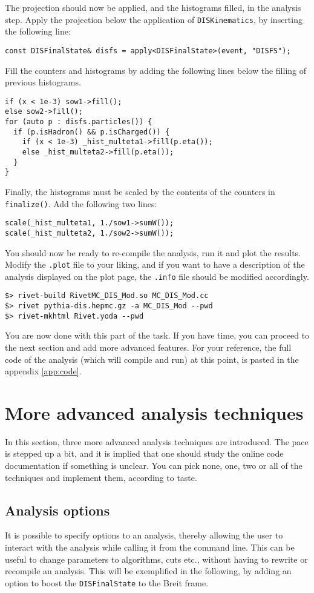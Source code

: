 \documentclass[11pt]{article}
\begin{document}
The projection should now be applied, and the histograms filled, in the analysis step. Apply the projection below the application of \texttt{DISKinematics}, by inserting the following line:
\begin{verbatim}
const DISFinalState& disfs = apply<DISFinalState>(event, "DISFS");
\end{verbatim}
Fill the counters and histograms by adding the following lines below the filling of previous histograms.
\begin{verbatim}
if (x < 1e-3) sow1->fill();
else sow2->fill();
for (auto p : disfs.particles()) {
  if (p.isHadron() && p.isCharged()) {
    if (x < 1e-3) _hist_multeta1->fill(p.eta());
    else _hist_multeta2->fill(p.eta());
  }
}
\end{verbatim}
Finally, the histograms must be scaled by the contents of the counters in \texttt{finalize()}. Add the following two lines:
\begin{verbatim}
scale(_hist_multeta1, 1./sow1->sumW());
scale(_hist_multeta2, 1./sow2->sumW());
\end{verbatim}
You should now be ready to re-compile the analysis, run it and plot the results. Modify the \texttt{.plot} file to your liking, and if you want to have a description of the analysis displayed on the plot page, the \texttt{.info} file should be modified accordingly.
\begin{verbatim}
$> rivet-build RivetMC_DIS_Mod.so MC_DIS_Mod.cc
$> rivet pythia-dis.hepmc.gz -a MC_DIS_Mod --pwd
$> rivet-mkhtml Rivet.yoda --pwd
\end{verbatim}

You are now done with this part of the task. If you have time, you can proceed to the next section and add more advanced features. For your reference, the full code of the analysis (which will compile and run) at this point, is pasted in the appendix \ref{app:code}.

\section{More advanced analysis techniques}
In this section, three more advanced analysis techniques are introduced. The pace is stepped up a bit, and it is implied that one should study the online code documentation if something is unclear. You can pick none, one, two or all of the techniques and implement them, according to taste.

\subsection{Analysis options}
It is possible to specify options to an analysis, thereby allowing the user to interact with the analysis while calling it from the command line. This can be useful to change parameters to algorithms, cuts etc., without having to rewrite or recompile an analysis. This will be exemplified in the following, by adding an option to boost the \texttt{DISFinalState} to the Breit frame.
\end{document}
